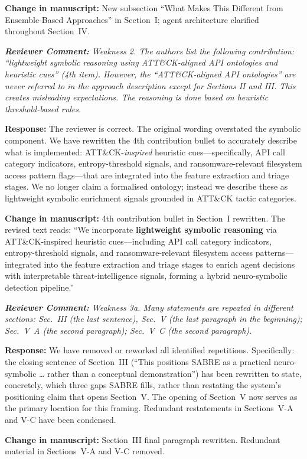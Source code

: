 \documentclass[11pt,a4paper]{article}
\newcommand{\RC}[1]{\begin{reviewbox}\textit{\textbf{Reviewer Comment:} #1}\end{reviewbox}}
\newcommand{\RS}[1]{\noindent\textcolor{responsegreen}{\textbf{Response:}} #1\par\medskip}
\newcommand{\CH}[1]{\noindent\textcolor{changebrown}{\textbf{Change in manuscript:}} #1\par\bigskip}
\begin{document}
\CH{New subsection ``What Makes This Different from Ensemble-Based Approaches''
in Section~I; agent architecture clarified throughout Section~IV.}

\RC{Weakness 2. The authors list the following contribution: ``lightweight symbolic
reasoning using ATT\&CK-aligned API ontologies and heuristic cues'' (4th item).
However, the ``ATT\&CK-aligned API ontologies'' are never referred to in the
approach description except for Sections II and III. This creates misleading
expectations. The reasoning is done based on heuristic threshold-based rules.}

\RS{The reviewer is correct. The original wording overstated the symbolic component.
We have rewritten the 4th contribution bullet to accurately describe what is
implemented: ATT\&CK-\emph{inspired} heuristic cues---specifically, API call
category indicators, entropy-threshold signals, and ransomware-relevant filesystem
access pattern flags---that are integrated into the feature extraction and triage
stages. We no longer claim a formalised ontology; instead we describe these as
lightweight symbolic enrichment signals grounded in ATT\&CK tactic categories.}

\CH{4th contribution bullet in Section~I rewritten. The revised text reads: ``We
incorporate \textbf{lightweight symbolic reasoning} via ATT\&CK-inspired heuristic
cues---including API call category indicators, entropy-threshold signals, and
ransomware-relevant filesystem access patterns---integrated into the feature
extraction and triage stages to enrich agent decisions with interpretable
threat-intelligence signals, forming a hybrid neuro-symbolic detection pipeline.''}

\RC{Weakness 3a. Many statements are repeated in different sections: Sec.~III (the
last sentence), Sec.~V (the last paragraph in the beginning); Sec.~V~A (the second
paragraph); Sec.~V~C (the second paragraph).}

\RS{We have removed or reworked all identified repetitions. Specifically: the closing
sentence of Section~III (``This positions SABRE as a practical neuro-symbolic \ldots
rather than a conceptual demonstration'') has been rewritten to state, concretely,
which three gaps SABRE fills, rather than restating the system's positioning claim
that opens Section~V. The opening of Section~V now serves as the primary location for
this framing. Redundant restatements in Sections~V-A and V-C have been condensed.}

\CH{Section~III final paragraph rewritten. Redundant material in Sections~V-A
and V-C removed.}
\end{document}
